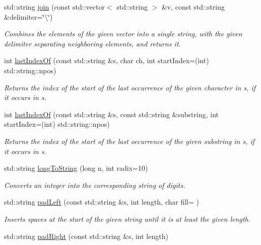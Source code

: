 \begin{DoxyCompactItemize}
std\+::string \mbox{\hyperlink{namespacesgl_1_1priv_1_1strlib_a057d49d2499f5680499155e2d6b82f7a}{join}} (const std\+::vector$<$ std\+::string $>$ \&v, const std\+::string \&delimiter=\char`\"{}\textbackslash{}\char`\"{})
\begin{DoxyCompactList}\small\item\em Combines the elements of the given vector into a single string, with the given delimiter separating neighboring elements, and returns it. \end{DoxyCompactList}\item 
int \mbox{\hyperlink{namespacesgl_1_1priv_1_1strlib_a9df48773b46bf6e813faa1c60ec344ed}{last\+Index\+Of}} (const std\+::string \&s, char ch, int start\+Index=(int) std\+::string\+::npos)
\begin{DoxyCompactList}\small\item\em Returns the index of the start of the last occurrence of the given character in s, if it occurs in s. \end{DoxyCompactList}\item 
int \mbox{\hyperlink{namespacesgl_1_1priv_1_1strlib_acdad5d6c6003d11b1f4d2c10deadcc28}{last\+Index\+Of}} (const std\+::string \&s, const std\+::string \&substring, int start\+Index=(int) std\+::string\+::npos)
\begin{DoxyCompactList}\small\item\em Returns the index of the start of the last occurrence of the given substring in s, if it occurs in s. \end{DoxyCompactList}\item 
std\+::string \mbox{\hyperlink{namespacesgl_1_1priv_1_1strlib_a2abafd3e6dc4ddbb44d13b691ed962da}{long\+To\+String}} (long n, int radix=10)
\begin{DoxyCompactList}\small\item\em Converts an integer into the corresponding string of digits. \end{DoxyCompactList}\item 
std\+::string \mbox{\hyperlink{namespacesgl_1_1priv_1_1strlib_a0348f17da6a9403cb06a7464b562da44}{pad\+Left}} (const std\+::string \&s, int length, char fill=\textquotesingle{} \textquotesingle{})
\begin{DoxyCompactList}\small\item\em Inserts spaces at the start of the given string until it is at least the given length. \end{DoxyCompactList}\item 
std\+::string \mbox{\hyperlink{namespacesgl_1_1priv_1_1strlib_a00d3d8b86782caf6b4d4386ef8c020ce}{pad\+Right}} (const std\+::string \&s, int length)

\end{DoxyCompactItemize}
